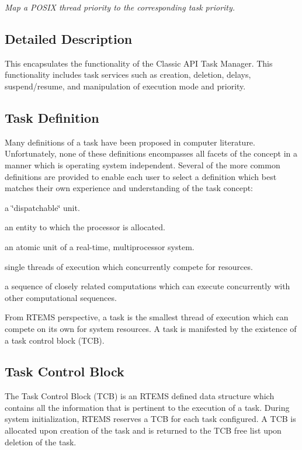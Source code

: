 \begin{DoxyCompactItemize}
\begin{DoxyCompactList}\small\item\em Map a P\+O\+S\+IX thread priority to the corresponding task priority. \end{DoxyCompactList}\end{DoxyCompactItemize}


\subsection{Detailed Description}
This encapsulates the functionality of the Classic A\+PI Task Manager. This functionality includes task services such as creation, deletion, delays, suspend/resume, and manipulation of execution mode and priority.\hypertarget{group__ClassicTasks_ClassicTasksSecTaskDefinition}{}\subsection{Task Definition}\label{group__ClassicTasks_ClassicTasksSecTaskDefinition}
Many definitions of a task have been proposed in computer literature. Unfortunately, none of these definitions encompasses all facets of the concept in a manner which is operating system independent. Several of the more common definitions are provided to enable each user to select a definition which best matches their own experience and understanding of the task concept\+:


\begin{DoxyItemize}
\item a \char`\"{}dispatchable\char`\"{} unit.
\item an entity to which the processor is allocated.
\item an atomic unit of a real-\/time, multiprocessor system.
\item single threads of execution which concurrently compete for resources.
\item a sequence of closely related computations which can execute concurrently with other computational sequences.
\end{DoxyItemize}

From R\+T\+E\+MS\textquotesingle{} perspective, a task is the smallest thread of execution which can compete on its own for system resources. A task is manifested by the existence of a task control block (T\+CB).\hypertarget{group__ClassicTasks_ClassicTasksSecTaskControlBlock}{}\subsection{Task Control Block}\label{group__ClassicTasks_ClassicTasksSecTaskControlBlock}
The Task Control Block (T\+CB) is an R\+T\+E\+MS defined data structure which contains all the information that is pertinent to the execution of a task. During system initialization, R\+T\+E\+MS reserves a T\+CB for each task configured. A T\+CB is allocated upon creation of the task and is returned to the T\+CB free list upon deletion of the task.

